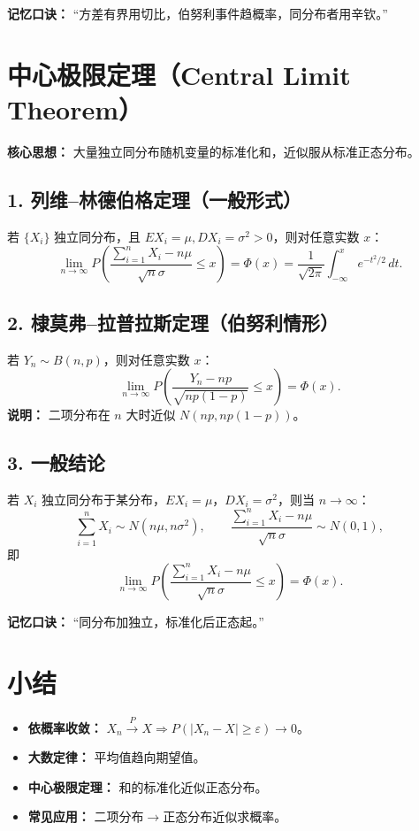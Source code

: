 \textbf{记忆口诀：}
“方差有界用切比，伯努利事件趋概率，同分布者用辛钦。”


\section{中心极限定理（Central Limit Theorem）}

\textbf{核心思想：}
大量独立同分布随机变量的标准化和，近似服从标准正态分布。

\subsection*{1. 列维–林德伯格定理（一般形式）}
若 $\{X_i\}$ 独立同分布，且 $E X_i=\mu, D X_i=\sigma^2>0$，则对任意实数 $x$：
$$
      \lim_{n\to\infty}P\!\left(\frac{\sum_{i=1}^{n}X_i-n\mu}{\sqrt{n}\sigma}\le x\right)
      =\Phi(x)=\frac{1}{\sqrt{2\pi}}\int_{-\infty}^{x}e^{-t^2/2}\,dt.
$$

\subsection*{2. 棣莫弗–拉普拉斯定理（伯努利情形）}
若 $Y_n\sim B(n,p)$，则对任意实数 $x$：
$$
      \lim_{n\to\infty}P\!\left(\frac{Y_n-np}{\sqrt{np(1-p)}}\le x\right)
      =\Phi(x).
$$
\textbf{说明：} 二项分布在 $n$ 大时近似 $N(np,np(1-p))$。

\subsection*{3. 一般结论}
若 $X_i$ 独立同分布于某分布，$E X_i=\mu$，$D X_i=\sigma^2$，则当 $n\to\infty$：
$$
      \sum_{i=1}^{n}X_i\sim N(n\mu,n\sigma^2),
      \qquad
      \frac{\sum_{i=1}^{n}X_i-n\mu}{\sqrt{n}\sigma}\sim N(0,1),
$$
即
$$
      \lim_{n\to\infty}P\!\left(\frac{\sum_{i=1}^{n}X_i-n\mu}{\sqrt{n}\sigma}\le x\right)=\Phi(x).
$$

\textbf{记忆口诀：}
“同分布加独立，标准化后正态起。”


\section*{小结}
\begin{itemize}
      \item \textbf{依概率收敛：} $X_n\xrightarrow{P}X \Rightarrow P(|X_n-X|\ge\varepsilon)\to0$。
      \item \textbf{大数定律：} 平均值趋向期望值。
      \item \textbf{中心极限定理：} 和的标准化近似正态分布。
      \item \textbf{常见应用：} 二项分布$\to$正态分布近似求概率。
\end{itemize}